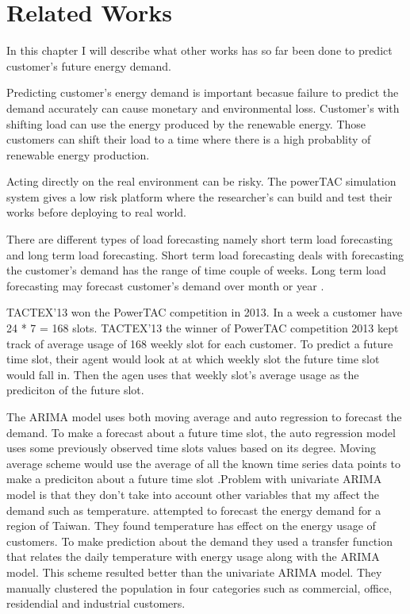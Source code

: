 
\chapter{Related Works}



In this chapter I will describe what other works has so far been done to predict customer's future energy demand.

Predicting customer's energy demand is important becasue failure to predict the demand accurately can cause monetary and environmental loss. Customer's with shifting load can use the energy produced by the renewable energy. Those customers can shift their load to a time where there is a high probablity of renewable energy production.

Acting directly on the real environment can be risky. The powerTAC simulation system gives a low risk platform where the researcher's can build and test their works before deploying to real world. 

There are different types of load forecasting namely short term load forecasting and long term load forecasting. Short term load forecasting deals with forecasting the customer's demand has the range of time couple of weeks. Long term load forecasting may forecast customer's demand over month or year \cite{cho1995customer}.

TACTEX'13 won the PowerTAC competition in 2013. In a week a customer have 24 * 7 = 168 slots. TACTEX'13 the winner of PowerTAC competition 2013 kept track of average usage of 168 weekly slot for each customer. To predict a future time slot, their agent would look at at which weekly slot the future time slot would fall in. Then the agen uses that weekly slot's average usage as the prediciton of the future slot.

The ARIMA model uses both moving average and auto regression to forecast the demand. To make a forecast about a future time slot, the auto regression model uses some previously observed time slots values based on its degree. Moving average scheme would use the average of all the known time series data points to make a prediciton about a future time slot .Problem with univariate ARIMA model is that they don't take into account other variables that my affect the demand such as temperature. \cite{cho1995customer} attempted to forecast the energy demand for a region of Taiwan. They found temperature has effect on the energy usage of customers. To make prediction about the demand they used a transfer function that relates the daily temperature with energy usage along with the ARIMA model. This scheme resulted better than the univariate ARIMA model. They manually clustered the population in four categories such as commercial, office, residendial and industrial customers. 

